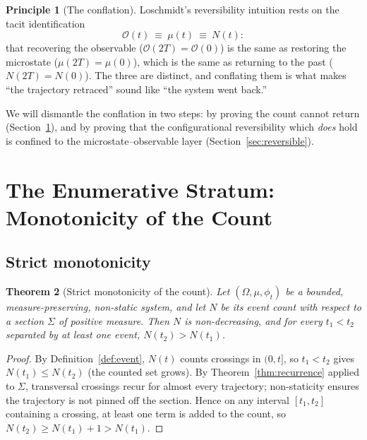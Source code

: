 \documentclass[11pt,a4paper]{article}
\theoremstyle{thmstyle}
\newtheorem{theorem}{Theorem}[section]
\theoremstyle{definition}
\newtheorem{principle}[theorem]{Principle}
\theoremstyle{remark}
\newcommand{\Mic}{\mu}
\newcommand{\Obs}{\mathcal{O}}
\newcommand{\Count}{N}
\newcommand{\flow}{\phi}
\begin{document}
\begin{principle}[The conflation]
\label{prin:conflation}
Loschmidt's reversibility intuition rests on the tacit identification
\[
\Obs(t)\ \equiv\ \Mic(t)\ \equiv\ \Count(t):
\]
that recovering the observable ($\Obs(2T)=\Obs(0)$) is the same as
restoring the microstate ($\Mic(2T)=\Mic(0)$), which is the same as
returning to the past ($\Count(2T)=\Count(0)$). The three are distinct,
and conflating them is what makes ``the trajectory retraced'' sound like
``the system went back.''
\end{principle}

We will dismantle the conflation in two steps: by proving the count
cannot return (Section~\ref{sec:count}), and by proving that the
configurational reversibility which \emph{does} hold is confined to the
microstate--observable layer (Section~\ref{sec:reversible}).

\section{The Enumerative Stratum: Monotonicity of the Count}
\label{sec:count}

\subsection{Strict monotonicity}
\label{sec:monotone}

\begin{theorem}[Strict monotonicity of the count]
\label{thm:monotone}
Let $(\Omega,\mu,\flow_t)$ be a bounded, measure-preserving, non-static
system, and let $\Count$ be its event count with respect to a section
$\Sigma$ of positive measure. Then $\Count$ is non-decreasing, and for
every $t_1<t_2$ separated by at least one event, $\Count(t_2)>\Count(t_1)$.
\end{theorem}

\begin{proof}
By Definition~\ref{def:event}, $\Count(t)$ counts crossings in $(0,t]$,
so $t_1<t_2$ gives $\Count(t_1)\leq\Count(t_2)$ (the counted set grows).
By Theorem~\ref{thm:recurrence} applied to $\Sigma$, transversal
crossings recur for almost every trajectory; non-staticity ensures the
trajectory is not pinned off the section. Hence on any interval
$[t_1,t_2]$ containing a crossing, at least one term is added to the
count, so $\Count(t_2)\geq\Count(t_1)+1>\Count(t_1)$.
\end{proof}
\end{document}
